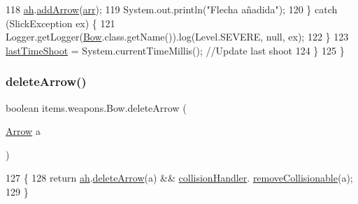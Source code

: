 \begin{DoxyCode}
118                 \mbox{\hyperlink{classitems_1_1weapons_1_1_bow_a04ecddeefa27f007f2e29a8fc8298e23}{ah}}.\mbox{\hyperlink{classitems_1_1weapons_1_1_arrow_handler_af197702f581022b65e7f0ded40f18758}{addArrow}}(\mbox{\hyperlink{classitems_1_1weapons_1_1_bow_a5b267dc01cddeb22261f8d5dde8bedc9}{arr}});
119                 System.out.println(\textcolor{stringliteral}{"Flecha añadida"});
120             \} \textcolor{keywordflow}{catch} (SlickException ex) \{
121                 Logger.getLogger(\mbox{\hyperlink{classitems_1_1weapons_1_1_bow_a9534e58ec2be5748c6dce306686b81ca}{Bow}}.class.getName()).log(Level.SEVERE, null, ex);
122             \}
123             \mbox{\hyperlink{classitems_1_1weapons_1_1_bow_aa0be9c972ce94d1a72b0285e44415ccf}{lastTimeShoot}} = System.currentTimeMillis();   \textcolor{comment}{//Update last shoot}
124         \}
125     \}
\end{DoxyCode}
\mbox{\label{classitems_1_1weapons_1_1_bow_a5786de599b80d151eb240b7801165ea5}} 
\subsubsection{\texorpdfstring{delete\+Arrow()}{deleteArrow()}}
{\footnotesize\ttfamily boolean items.\+weapons.\+Bow.\+delete\+Arrow (\begin{DoxyParamCaption}\item[{\mbox{\hyperlink{classitems_1_1weapons_1_1_arrow}{Arrow}}}]{a }\end{DoxyParamCaption})\hspace{0.3cm}{\ttfamily [inline]}}


\begin{DoxyCode}
127                                         \{
128         \textcolor{keywordflow}{return} \mbox{\hyperlink{classitems_1_1weapons_1_1_bow_a04ecddeefa27f007f2e29a8fc8298e23}{ah}}.\mbox{\hyperlink{classitems_1_1weapons_1_1_arrow_handler_ab7e4dce0dc3cd385a870fe54ca1cabf1}{deleteArrow}}(a) && \mbox{\hyperlink{classitems_1_1weapons_1_1_bow_a58b10332a113699f11dabaf41f76560a}{collisionHandler}}.
      \mbox{\hyperlink{classentities_1_1_collision_handler_a0634abfade22196f7c8292dca6d4c883}{removeCollisionable}}(a);
129     \}
\end{DoxyCode}
\mbox{\label{classitems_1_1weapons_1_1_bow_a969771698d6f7ab777a725c131ee362a}} 
